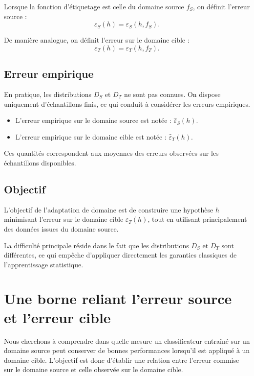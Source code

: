 \documentclass[a4paper,12pt]{article}
\theoremstyle{definition}
\theoremstyle{remark}
\begin{document}
Lorsque la fonction d’étiquetage est celle du domaine source $f_S$, on définit l’erreur source : 
\[
\varepsilon_S(h) = \varepsilon_S(h, f_S).
\]

De manière analogue, on définit l’erreur sur le domaine cible : 
\[
\varepsilon_T(h) = \varepsilon_T(h, f_T).
\]



\subsection{Erreur empirique}

En pratique, les distributions $D_S$ et $D_T$ ne sont pas connues. On dispose uniquement d’échantillons finis, ce qui conduit à considérer les erreurs empiriques.

\begin{itemize}
\item L’erreur empirique sur le domaine source est notée : $\hat{\varepsilon}_S(h)$.

\item L’erreur empirique sur le domaine cible est notée : $\hat{\varepsilon}_T(h)$.
\end{itemize}

Ces quantités correspondent aux moyennes des erreurs observées sur les échantillons disponibles.

\subsection{Objectif}

L’objectif de l’adaptation de domaine est de construire une hypothèse $h$ minimisant l’erreur sur le domaine cible $\varepsilon_T(h)$, tout en utilisant principalement des données issues du domaine source.

La difficulté principale réside dans le fait que les distributions $D_S$ et $D_T$ sont différentes, ce qui empêche d’appliquer directement les garanties classiques de l’apprentissage statistique.\\


\section{Une borne reliant l’erreur source et l’erreur cible}

Nous cherchons à comprendre dans quelle mesure un classificateur entraîné sur un
domaine source peut conserver de bonnes performances lorsqu’il est appliqué à un domaine
cible. L’objectif est donc d’établir une relation entre l’erreur commise sur le domaine source
et celle observée sur le domaine cible.
\end{document}
